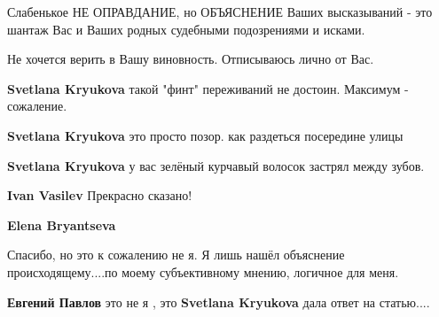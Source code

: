 \begin{itemize}
\begin{itemize}
Слабенькое НЕ ОПРАВДАНИЕ, но ОБЪЯСНЕНИЕ Ваших высказываний - это шантаж Вас и
Ваших родных судебными подозрениями и исками. 

Не хочется верить в Вашу виновность. Отписываюсь лично от Вас.

 
\textbf{Svetlana Kryukova} такой "финт" переживаний не достоин. Максимум - сожаление.

 
\textbf{Svetlana Kryukova} это просто позор. как раздеться посередине улицы

 
\textbf{Svetlana Kryukova} у вас зелёный курчавый волосок застрял между зубов.

 
\textbf{Ivan Vasilev} Прекрасно сказано!

 
\textbf{Elena Bryantseva} 

Спасибо, но это к сожалению не я. Я лишь нашёл объяснение происходящему....по
моему субъективному мнению, логичное для меня.

 
\textbf{Евгений Павлов} это не я , это \textbf{Svetlana Kryukova} дала ответ на статью....


\end{itemize}
\end{itemize}
